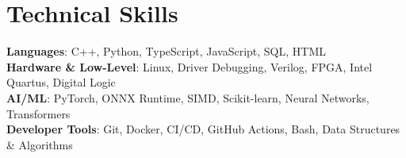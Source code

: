 \documentclass[letterpaper,11pt]{article}
\begin{document}
\section{Technical Skills}
 \begin{itemize}[leftmargin=0.15in, label={}]
    \small{\item{
     \textbf{Languages}{: C++, Python, TypeScript, JavaScript, SQL, HTML} \\
     \textbf{Hardware \& Low-Level}{: Linux, Driver Debugging, Verilog, FPGA, Intel Quartus, Digital Logic} \\
     \textbf{AI/ML}{: PyTorch, ONNX Runtime, SIMD, Scikit-learn, Neural Networks, Transformers} \\
     \textbf{Developer Tools}{: Git, Docker, CI/CD, GitHub Actions, Bash, Data Structures \& Algorithms} \\
    }}
 \end{itemize}

\end{document}
